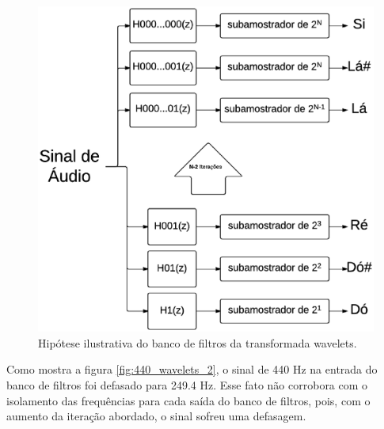 \begin{figure}[t]
    \centering
    \includegraphics[keepaspectratio=true,scale=1]{figuras/wavelet_figura.eps}
  \caption{Hipótese ilustrativa do banco de filtros da transformada wavelets.}
  \label{fig:banco_de_filtros}
\end{figure}

\newpage
Como mostra a figura \ref{fig:440_wavelets_2}, o sinal de 440 Hz na entrada do banco de filtros foi defasado para 249.4 Hz. Esse fato não corrobora com o isolamento das frequências para cada saída do banco de filtros, pois, com o aumento da iteração abordado, o sinal sofreu uma defasagem.

